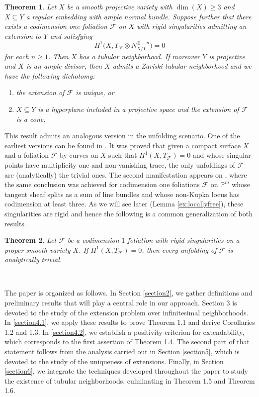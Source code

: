 \documentclass[reqno]{amsart}
\theoremstyle{plain}
\renewcommand\P{\mathbb{P}}
\newcommand{\F}{\mathscr{F}}
\newcounter{Theorem}
\newtheorem{theorem}{Theorem}[section]
\theoremstyle{definition}
\theoremstyle{named}
\begin{document}
\begin{theorem}
  Let $X$ be a smooth projective variety with $\dim(X)\geq 3$ and $X\subseteq Y$ a regular embedding with ample normal bundle. Suppose further that there exists a codimension one foliation $\F$ on $X$ with rigid singularities admitting an extension to $Y$ and satisfying
    $$H^1\big(X,T_\F\otimes N_{X/Y}^{\otimes -n}\big) = 0$$
for each $n\geqslant 1$. Then $X$ has a tubular neighborhood. If moreover $Y$ is projective and $X$ is an ample divisor, then $X$ admits a Zariski tubular neighborhood and we have the following dichotomy:
\begin{enumerate}
    \item the extension of $\F$ is unique, or
    \item $X\subseteq Y$ is a hyperplane included in a projective space and the extension of $\F$ is a cone.
\end{enumerate}
\end{theorem} 


This result admits an analogous version in the unfolding scenario. One of the earliest versions can be found in \cite{gomez1989unfoldings}. It was proved that given a compact surface $X$ and a foliation $\F$ by curves on $X$ such that $H^1(X,T_\F)= 0$ and whose singular points have multiplicity one and non-vanishing trace, the only unfoldings of $\F$ are (analytically) the trivial ones. The second manifestation appears on \cite{massri2018kupka}, where the same conclusion was achieved for codimension one foliations $\F$ on $\P^m$ whose tangent sheaf splits as a sum of line bundles and whose non-Kupka locus has codimension at least three. As we will see later (Lemma \ref{ex:locallyfree}), these singularities are rigid and hence the following is a common generalization of both results.

\begin{theorem}
Let $\F$ be a codimension $1$ foliation with rigid singularities on a proper smooth variety $X$. If $H^1(X,T_\F) = 0$, then every unfolding of $\F$ is analytically trivial. 
\end{theorem}
\,

The paper is organized as follows. In Section \ref{section2}, we gather definitions and preliminary results that will play a central role in our approach.
Section 3 is devoted to the study of the extension problem over infinitesimal neighborhoods.
In \ref{section4.1}, we apply these results to prove Theorem 1.1 and derive Corollaries 1.2 and 1.3. In \ref{section4.2}, we establish a positivity criterion for extendability, which corresponds to the first assertion of Theorem 1.4. The second part of that statement follows from the analysis carried out in Section \ref{section5}, which is devoted to the study of the uniqueness of extensions.
Finally, in Section \ref{section6}, we integrate the techniques developed throughout the paper to study the existence of tubular neighborhoods, culminating in Theorem 1.5 and Theorem 1.6.
\end{document}
